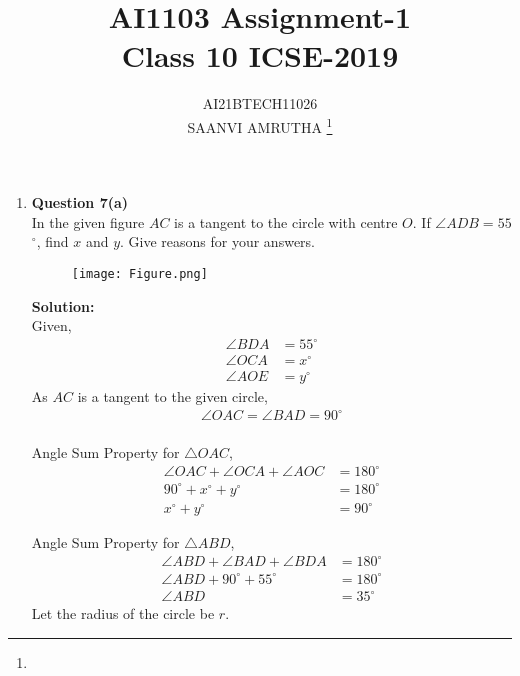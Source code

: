 \documentclass[journal,12pt,twocolumn]{IEEEtran}
\begin{document}
\let\vec\mathbf
\renewcommand{\thefigure}{\theproblem}
\def\putbox#1#2#3{\makebox[0in][l]{\makebox[#1][l]{}\raisebox{\baselineskip}[0in][0in]{\raisebox{#2}[0in][0in]{#3}}}}
     \def\rightbox#1{\makebox[0in][r]{#1}}
     \def\centbox#1{\makebox[0in]{#1}}
     \def\topbox#1{\raisebox{-\baselineskip}[0in][0in]{#1}}
     \def\midbox#1{\raisebox{-0.5\baselineskip}[0in][0in]{#1}}
\vspace{3cm}
\title{AI1103 Assignment-1\\Class 10 ICSE-2019}
\author{AI21BTECH11026\\SAANVI AMRUTHA
	\thanks{}
}
\maketitle
\newpage
\bigskip
\begin{enumerate}[label=,ref=]
\item \textbf{Question 7(a)}\\ 
In the given figure $AC$ is a tangent to the circle with centre $O$. If $\angle$$ADB=55$$^{\circ}$, find $x$ and $y$. Give reasons for your answers.\\
\begin{figure}[h]
\texttt{[image: Figure.png]}
\label{Fig}
\end{figure}

\textbf{Solution:} \\
Given,\\
  \begin{align}
\angle BDA&=55^\circ \\ 
\angle OCA&=x^\circ\\
 \angle AOE&=y^\circ
 \end{align} 
As $AC$ is a tangent to the given circle, 
\begin{align} 
\angle OAC=\angle BAD=90^\circ
\end{align} 
\\
Angle Sum Property for $\triangle OAC$, 
        \begin{align}
             \angle OAC+\angle OCA+\angle AOC&=180^\circ \\
              90^\circ+x^\circ+y^\circ&=180^\circ\\
             x^\circ+y^\circ&=90^\circ
               \end{align} 
             
               
Angle Sum Property for $\triangle ABD$,    
\begin{align}
               \angle ABD+\angle BAD+\angle BDA&=180^\circ\\
               \angle ABD+90^\circ+55^\circ&=180^\circ\\
               \angle ABD&=35^\circ
 \end{align}  
 Let the radius of the circle be $r$.\\


\end{enumerate}
\end{document}
